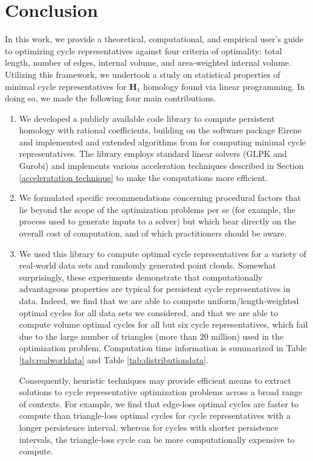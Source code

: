 \documentclass[utf8]{formatting_stuff/frontiersFPHY}
\newcommand{\Homologies}[0]{\mathbf{H}}
\newcommand{\tab}{Table }
\newcommand{\se}{Section }
\theoremstyle{plain}
\theoremstyle{definition}
\begin{document}
 \section{Conclusion}\label{discussion}

In this work, we provide a theoretical, computational, and empirical user's guide to optimizing cycle representatives against four criteria of optimality: total length, number of edges, internal volume, and area-weighted internal volume. Utilizing this framework, we undertook a study on statistical properties of minimal cycle representatives for $\Homologies_1$ homology found via linear programming. In doing so, we made the following four main contributions.
\begin{enumerate}
    \item We developed a publicly available code library \cite{li_thompson} to compute persistent homology with rational coefficients, building on the software package Eirene \cite{eirene} and implemented and extended algorithms from \cite{Escolar2016, Obayashi2018}  for computing minimal cycle representatives. The library employs standard linear solvers (GLPK and Gurobi) and implements various acceleration techniques described in \se \ref{acceleratation technique} to make the computations more efficient. 
    \item We formulated specific recommendations concerning procedural factors that lie beyond the scope of the optimization problems per se (for example, the process used to generate inputs to a solver) but which bear directly on the overall cost of computation, and of which practitioners should be aware. 
    \item We used this library to compute optimal cycle representatives for a variety of real-world data sets and randomly generated point clouds.  Somewhat surprisingly, these experiments demonstrate that computationally advantageous properties are typical for persistent cycle representatives in data. Indeed, we find that we are able to compute uniform/length-weighted optimal cycles for all data sets we considered, and that we are able to compute volume optimal cycles for all but six cycle representatives, which fail due to the large number of triangles (more than $20$ million) used in the optimization problem. Computation time information is summarized in \tab \ref{tab:realworldata} and \tab \ref{tab:distributiondata}. 
    
    Consequently, heuristic techniques may provide efficient means to extract solutions to cycle representative optimization problems across a broad range of contexts. For example, we find that edge-loss optimal cycles are faster to compute than triangle-loss optimal cycles for cycle representatives with a longer persistence interval, whereas for cycles with shorter persistence intervals, the triangle-loss cycle can be more computationally expensive to compute.
    

\end{enumerate}
\end{document}

